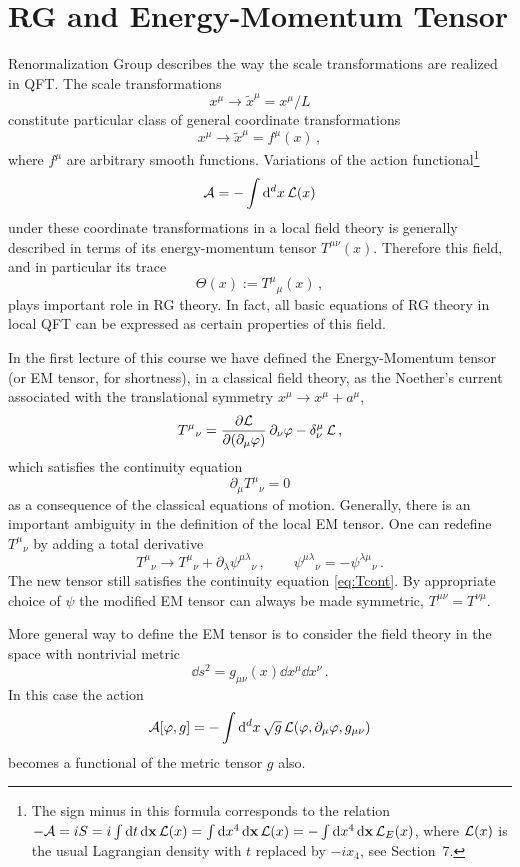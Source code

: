 \section{RG and Energy-Momentum Tensor}

Renormalization Group describes the way the scale transformations are realized in
QFT. The scale transformations
\[
x^\mu\to\tilde x^\mu=x^\mu/L
\]
constitute particular class of general coordinate transformations
\[
x^\mu\to\tilde x^\mu=f^\mu(x)\,,
\]
where $f^\mu$ are arbitrary smooth functions. Variations of the action
functional\footnote{The sign minus in this formula corresponds to the relation
$-\mathcal A=iS=i\int \mathop{}\!\mathrm{d} t\mathop{}\!\mathrm{d}\mathbf{x}\,\mathcal{L}(x)=\int \mathop{}\!\mathrm{d} x^4\mathop{}\!\mathrm{d}\mathbf{x}\,\mathcal{L}(x)=-\int \mathop{}\!\mathrm{d} x^4\mathop{}\!\mathrm{d}\mathbf{x}\,\mathcal{L}_E(x)$,
where $\mathcal{L}(x)$ is the usual Lagrangian density with $t$ replaced by $-ix_4$, see
Section~7.}
\begin{equation}\label{eq:Aminus}
\mathcal A=-\int \mathop{}\!\mathrm{d}^dx\,\mathcal{L}(x)
\end{equation}
under these coordinate transformations in a local field theory is generally
described in terms of its energy-momentum tensor $T^{\mu\nu}(x)$. Therefore this
field, and in particular its trace
\[
\Theta(x):=T^\mu{}_\mu(x)\,,
\]
plays important role in RG theory. In fact, all basic equations of RG theory in
local QFT can be expressed as certain properties of this field.

In the first lecture of this course we have defined the Energy-Momentum tensor (or
EM tensor, for shortness), in a classical field theory, as the Noether's current
associated with the translational symmetry $x^\mu\to x^\mu+a^\mu$,
\[
T^\mu{}_\nu=\frac{\partial\mathcal{L}}{\partial(\partial_\mu\varphi)}\,\partial_\nu\varphi-\delta^\mu_\nu\,\mathcal{L}\,,
\]
which satisfies the continuity equation
\begin{equation}\label{eq:Tcont}
\partial_\mu T^\mu{}_\nu=0
\end{equation}
as a consequence of the classical equations of motion. Generally, there is an
important ambiguity in the definition of the local EM tensor. One can redefine
$T^\mu{}_\nu$ by adding a total derivative
\[
T^\mu{}_\nu\to T^\mu{}_\nu+\partial_\lambda\psi^{\mu\lambda}{}_\nu\,,\qquad\psi^{\mu\lambda}{}_\nu=-\psi^{\lambda\mu}{}_\nu\,.
\]
The new tensor still satisfies the continuity equation \eqref{eq:Tcont}. By
appropriate choice of $\psi$ the modified EM tensor can always be made symmetric,
$T^{\mu\nu}=T^{\nu\mu}$.

More general way to define the EM tensor is to consider the field theory in the
space with nontrivial metric
\begin{equation}\label{eq:metric}
\dd s^2=g_{\mu\nu}(x)\dd x^\mu \dd x^\nu\,.
\end{equation}
In this case the action
\[
\mathcal A[\varphi,g]=-\int \mathop{}\!\mathrm{d}^dx\,\sqrt g\,\mathcal{L}(\varphi,\partial_\mu\varphi,g_{\mu\nu})
\]
becomes a functional of the metric tensor $g$ also.

